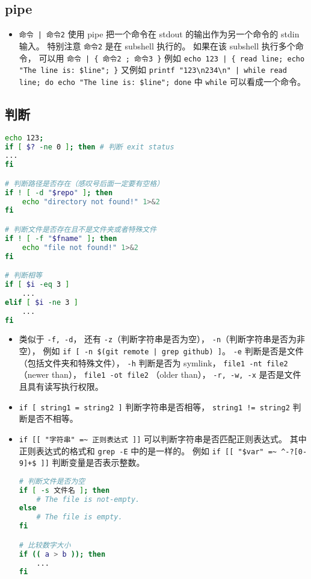 \subsection{pipe}
\begin{itemize}
\item \verb`命令 | 命令2` 使用 pipe 把一个命令在 stdout 的输出作为另一个命令的 stdin 输入。 特别注意 \verb|命令2| 是在 subshell 执行的。 如果在该 subshell 执行多个命令， 可以用 \verb`命令 | { 命令2 ; 命令3 }` 例如 \verb`echo 123 | { read line; echo "The line is: $line"; }` 又例如 \verb`printf "123\n234\n" | while read line; do echo "The line is: $line"; done` 中 \verb|while| 可以看成一个命令。
\end{itemize}


\subsection{判断}
\begin{lstlisting}[language=bash]
echo 123;
if [ $? -ne 0 ]; then # 判断 exit status
...
fi

# 判断路径是否存在（感叹号后面一定要有空格）
if ! [ -d "$repo" ]; then
    echo "directory not found!" 1>&2
fi

# 判断文件是否存在且不是文件夹或者特殊文件
if ! [ -f "$fname" ]; then
    echo "file not found!" 1>&2
fi

# 判断相等
if [ $i -eq 3 ]
    ...
elif [ $i -ne 3 ]
    ...
fi
\end{lstlisting}
\begin{itemize}
\item 类似于 \verb|-f, -d|， 还有 \verb|-z|（判断字符串是否为空）， \verb|-n|（判断字符串是否为非空）， 例如 \verb`if [ -n $(git remote | grep github) ]`。  \verb|-e| 判断是否是文件（包括文件夹和特殊文件）， \verb|-h| 判断是否为 symlink， \verb|file1 -nt file2| （newer than）， \verb|file1 -ot file2| （older than）， \verb|-r, -w, -x| 是否是文件且具有读写执行权限。
\item \verb|if [ string1 = string2 ]| 判断字符串是否相等， \verb|string1 != string2| 判断是否不相等。
\item \verb|if [[ "字符串" =~ 正则表达式 ]]| 可以判断字符串是否匹配正则表达式。 其中正则表达式的格式和 \verb|grep -E| 中的是一样的。 例如 \verb|if [[ "$var" =~ ^-?[0-9]+$ ]]| 判断变量是否表示整数。
\begin{lstlisting}[language=bash]
# 判断文件是否为空
if [ -s 文件名 ]; then
    # The file is not-empty.
else
    # The file is empty.
fi

# 比较数字大小
if (( a > b )); then
    ...
fi
\end{lstlisting}
\end{itemize}

